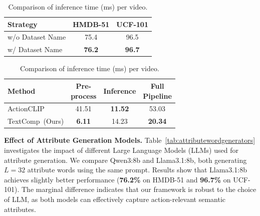 \documentclass[letterpaper]{article} %
\newcommand{\methodname}{TextComp}
\begin{document}
\begin{table}[tb]
\begin{minipage}[t]{0.48\textwidth}
    \vspace{0pt} %
    \centering
    \begin{threeparttable}
        \caption{Ablative evaluation of Prompt configuration ablation.}
        \label{tab:prompt_ablation}
        \begin{tabular}{@{}lcc@{}}
        \toprule
        Strategy & HMDB-51 & UCF-101 \\
        \midrule
        w/o Dataset Name & 75.4 & 96.5 \\
        w/ Dataset Name & \textbf{76.2} & \textbf{96.7} \\
        \bottomrule
        \end{tabular}
    \end{threeparttable}
\end{minipage}\hfill
\begin{minipage}[t]{0.48\textwidth}
    \vspace{0pt} %
    \centering
    \setlength{\tabcolsep}{2pt} 
    \begin{threeparttable}
        \caption{Comparison of inference time (ms) per video.}
        \label{tab:inferenceefficiency}
        \begin{tabular}{@{}lccc@{}}
        \toprule
        Method & \shortstack{Pre-\\process} & Inference & \shortstack{Full\\Pipeline} \\
        \midrule
        ActionCLIP~\cite{wang2021actionclipnewparadigmvideo} & 41.51 & \textbf{11.52} & 53.03 \\
        \methodname~(Ours) & \textbf{6.11} & 14.23 & \textbf{20.34} \\
        \bottomrule
        \end{tabular}
    \end{threeparttable}
\end{minipage}

\end{table}
\vspace{2mm} %



\noindent\textbf{Effect of Attribute Generation Models.} Table~\ref{tab:attributewordgenerators} investigates the impact of different Large Language Models (LLMs) used for attribute generation. We compare Qwen3:8b and Llama3.1:8b, both generating $L=32$ attribute words using the same prompt. Results show that Llama3.1:8b achieves slightly better performance (\textbf{76.2\%} on HMDB-51 and \textbf{96.7\%} on UCF-101). The marginal difference indicates that our framework is robust to the choice of LLM, as both models can effectively capture action-relevant semantic attributes.
\end{document}
